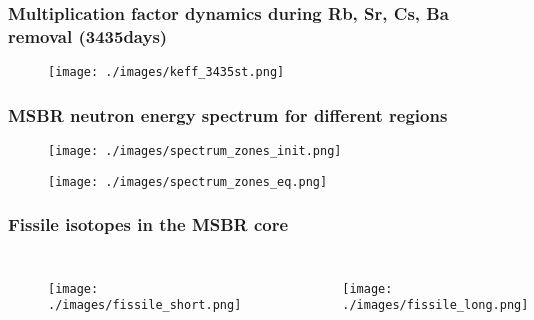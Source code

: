 \documentclass[9pt,handout]{beamer}
\begin{document}




\begin{frame}
  \frametitle{Multiplication factor dynamics during Rb, Sr, Cs, Ba removal (3435days)}
               \begin{figure}[t]
                \vspace*{-0.1in}
                \texttt{[image: ./images/keff\_3435st.png]}
               \end{figure}

\end{frame}


\begin{frame}
  \frametitle{\gls{MSBR} neutron energy spectrum for different regions}
               \begin{figure}[t]
                \vspace*{-0.1in}
                \texttt{[image: ./images/spectrum\_zones\_init.png]}
               \end{figure}
               \begin{figure}[t]
                \vspace*{-0.1in}
                \texttt{[image: ./images/spectrum\_zones\_eq.png]}
               \end{figure}

\end{frame}

\begin{frame}
  \frametitle{Fissile isotopes in the \gls{MSBR} core}
  \begin{columns}
    \column[t]{6cm}
               \begin{figure}[t]
                \vspace*{-0.1in}
                \texttt{[image: ./images/fissile\_short.png]}
               \end{figure}
    \column[t]{6cm}
               \begin{figure}[t]
                \vspace*{-0.1in}
                \texttt{[image: ./images/fissile\_long.png]}
               \end{figure}
    \end{columns}
\end{frame}
\end{document}
